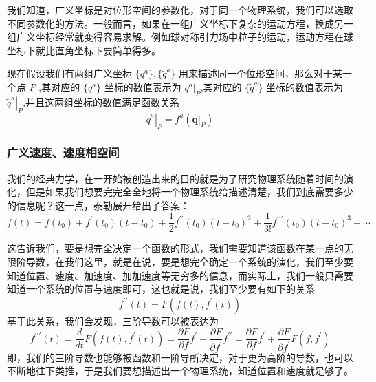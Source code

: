 我们知道，广义坐标是对位形空间的参数化，对于同一个物理系统，我们可以选取不同参数化的方法。一般而言，如果在一组广义坐标下复杂的运动方程，换成另一组广义坐标经常就变得容易求解。例如球对称引力场中粒子的运动，运动方程在球坐标下就比直角坐标下要简单得多。

现在假设我们有两组广义坐标 $\{q^a\} , \{\tilde{q}^a\}$ 用来描述同一个位形空间，那么对于某一个点 $P$ ,其对应的 $\{q^a\}$ 坐标的数值表示为 $ \left. q^a \right|_P$,其对应的 $\{\tilde{q}^a\}$ 坐标的数值表示为 $ \left. \tilde{q}^a \right|_P$,并且这两组坐标的数值满足函数关系
\begin{equation}
    \left.\tilde{q}^a\right|_P = f^a\left(\mathbf{q}|_P \right)
\end{equation}


\subsubsection{\protect\hyperlink{:}{广义速度、速度相空间}}

我们的经典力学，在一开始被创造出来的目的就是为了研究物理系统随着时间的演化，但是如果我们想要完完全全地将一个物理系统给描述清楚，我们到底需要多少的信息呢？这一点，泰勒展开给出了答案：
\begin{equation}
    f(t) = f(t_0) + f^{\prime}(t_0)(t - t_0) + \frac{1}{2}f^{\prime\prime}(t_0)(t - t_0)^2 + \frac{1}{3!}f^{\prime\prime\prime}(t_0)(t - t_0)^3 + \cdots
\end{equation}

这告诉我们，要是想完全决定一个函数的形式，我们需要知道该函数在某一点的无限阶导数，在我们这里，就是在说，要是想完全确定一个系统的演化，我们至少要知道位置、速度、加速度、加加速度等无穷多的信息，而实际上，我们一般只需要知道一个系统的位置与速度即可，这也就是说，我们至少要有如下的关系
\begin{equation}
    f^{\prime\prime}(t) = F(f(t),f^{\prime}(t))
\end{equation}
基于此关系，我们会发现，三阶导数可以被表达为
\begin{equation}
    f^{\prime\prime\prime}(t) = \frac{d}{dt}F(f(t),f^{\prime}(t)) = \frac{\partial F}{\partial f} f^\prime + \frac{\partial F}{\partial f^\prime} f^{\prime\prime} = \frac{\partial F}{\partial f} f^\prime + \frac{\partial F}{\partial f^\prime}F(f,f^{\prime})
\end{equation}
即，我们的三阶导数也能够被函数和一阶导所决定，对于更为高阶的导数，也可以不断地往下类推，于是我们要想描述出一个物理系统，知道位置和速度就足够了。

